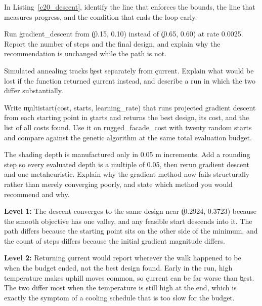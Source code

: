 

In Listing~\ref{c20_descent}, identify the line that enforces the bounds, the
line that measures progress, and the condition that ends the loop early.


Run \c{gradient_descent} from \c{(0.15, 0.10)} instead of \c{(0.65, 0.60)} at
rate 0.0025. Report the number of steps and the final design, and explain why the
recommendation is unchanged while the path is not.


Simulated annealing tracks \c{best} separately from \c{current}. Explain what
would be lost if the function returned \c{current} instead, and describe a run in
which the two differ substantially.


Write \c{multistart(cost, starts, learning_rate)} that runs projected gradient
descent from each starting point in \c{starts} and returns the best design, its
cost, and the list of all costs found. Use it on \c{rugged_facade_cost} with
twenty random starts and compare against the genetic algorithm at the same total
evaluation budget.


The shading depth is manufactured only in 0.05 m increments. Add a rounding step
so every evaluated depth is a multiple of 0.05, then rerun gradient descent and
one metaheuristic. Explain why the gradient method now fails structurally rather
than merely converging poorly, and state which method you would recommend and
why.


\textbf{Level 1:} The descent converges to the same design near
\c{(0.2924, 0.3723)} because the smooth objective has one valley, and any
feasible start descends into it. The path differs because the starting point sits
on the other side of the minimum, and the count of steps differs because the
initial gradient magnitude differs.

\textbf{Level 2:} Returning \c{current} would report wherever the walk happened
to be when the budget ended, not the best design found. Early in the run, high
temperature makes uphill moves common, so \c{current} can be far worse than
\c{best}. The two differ most when the temperature is still high at the end,
which is exactly the symptom of a cooling schedule that is too slow for the
budget.

